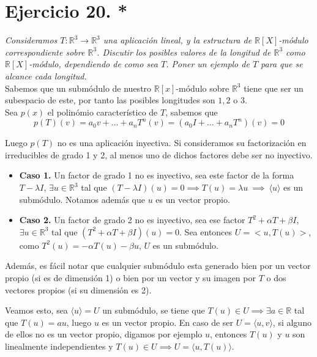 \section{Ejercicio 20. *} \textit{Consideramos \(T:\mathbb{R}^3 \to
  \mathbb{R}^3\) una aplicación lineal, y la estructura de
  \(\mathbb{R}[X]\)-módulo correspondiente sobre \(\mathbb{R}^3\). Discutir los
  posibles valores de la longitud de \(\mathbb{R}^3\) como
  \(\mathbb{R}[X]\)-módulo, dependiendo de como sea \(T\). Poner un ejemplo de
  \(T\) para que se alcance cada longitud.}\\

Sabemos que un submódulo de nuestro \(\mathbb{R}[x]\)-módulo sobre
\(\mathbb{R}^3\) tiene  que ser un subespacio de este, por tanto las posibles
longitudes son \(1,2\) o \(3\).\\

Sea \(p(x)\) el polinómio característico de \(T\), sabemos que
\[
  p(T)(v) =  a_0v + \dots + a_nT^n(v) = (a_0I + \dots + a_nT^n)(v) = 0
\]

Luego \(p(T)\) no es una aplicación inyectiva. Si consideramos su factorización en irreducibles de grado 1 y 2, al menos uno de dichos factores debe ser no inyectivo.

\begin{itemize}
\item \textbf{Caso 1.} Un factor de grado 1 no es inyectivo, sea este factor de la
  forma \(T - \lambda I\), \(\exists u \in \mathbb{R}^3\) tal que \((T - \lambda
  I)(u) = 0 \implies T(u) = \lambda u \ \implies \ \langle u \rangle\) es un submódulo. Notamos además que \(u\) es un vector propio.
\item \textbf{Caso 2.} Un factor de grado 2 no es inyectivo, sea ese factor
  \(T^2 + \alpha T + \beta I\), \(\exists u \in \mathbb{R}^3\) tal que \((T^2 +
  \alpha T + \beta I)(u)= 0\). Sea entonces \(U = <u,T(u)>\), como \(T^2(u) =
  -\alpha T(u) - \beta u \), \(U\) es un submódulo.
\end{itemize}

Además, es fácil notar que cualquier submódulo esta generado bien por un vector propio (si es de dimensión 1) o bien por un vector y su imagen por \(T\) o dos vectores propios (si su dimensión es 2).

Veamos esto, sea \(\langle u \rangle = U\) un submódulo, se tiene que \(T(u)
\in U \implies \exists a \in \mathbb{R}\) tal que \(T(u) = au\), luego \(u\) es un
vector propio. En caso de ser \(U = \langle u , v \rangle\), si alguno de ellos
no es un vector propio, digamos por ejemplo \(u\), entonces \(T(u)\) y \(u\) son linealmente independientes y
\(T(u) \in U \implies U = \langle u , T(u) \rangle\).\\


